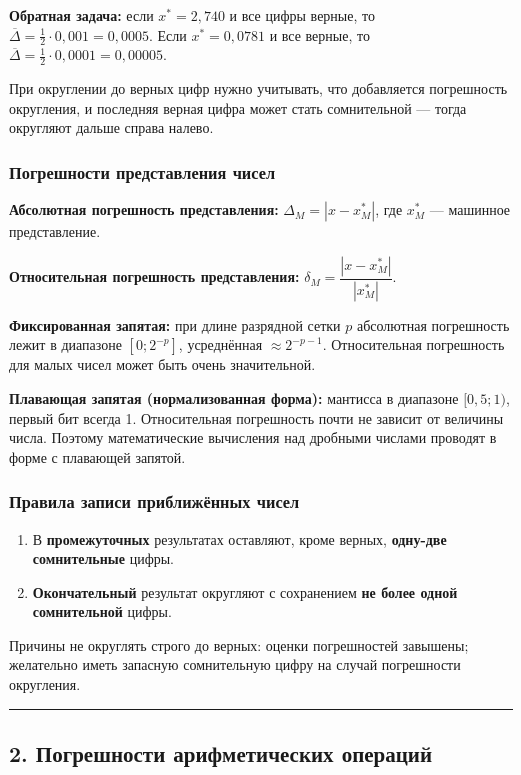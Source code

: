 \documentclass[14pt,a4paper]{extarticle}
\begin{document}
\textbf{Обратная задача:} если $x^* = 2{,}740$ и все цифры верные, то $\overline{\Delta} = \frac{1}{2} \cdot 0{,}001 = 0{,}0005$. Если $x^* = 0{,}0781$ и все верные, то $\overline{\Delta} = \frac{1}{2} \cdot 0{,}0001 = 0{,}00005$.

При округлении до верных цифр нужно учитывать, что добавляется погрешность округления, и последняя верная цифра может стать сомнительной --- тогда округляют дальше справа налево.

\subsubsection{Погрешности представления чисел}

\textbf{Абсолютная погрешность представления:} $\Delta_M = |x - x^*_M|$, где $x^*_M$ --- машинное представление.

\textbf{Относительная погрешность представления:} $\delta_M = \dfrac{|x - x^*_M|}{|x^*_M|}$.

\textbf{Фиксированная запятая:} при длине разрядной сетки $p$ абсолютная погрешность лежит в диапазоне $[0; 2^{-p}]$, усреднённая $\approx 2^{-p-1}$. Относительная погрешность для малых чисел может быть очень значительной.

\textbf{Плавающая запятая (нормализованная форма):} мантисса в диапазоне $[0{,}5; 1)$, первый бит всегда 1. Относительная погрешность почти не зависит от величины числа. Поэтому математические вычисления над дробными числами проводят в форме с плавающей запятой.

\subsubsection{Правила записи приближённых чисел}

\begin{enumerate}
    \item В \textbf{промежуточных} результатах оставляют, кроме верных, \textbf{одну-две сомнительные} цифры.
    \item \textbf{Окончательный} результат округляют с сохранением \textbf{не более одной сомнительной} цифры.
\end{enumerate}

Причины не округлять строго до верных: оценки погрешностей завышены; желательно иметь запасную сомнительную цифру на случай погрешности округления.

\hrule\bigskip

\subsection{2. Погрешности арифметических операций}
\end{document}
